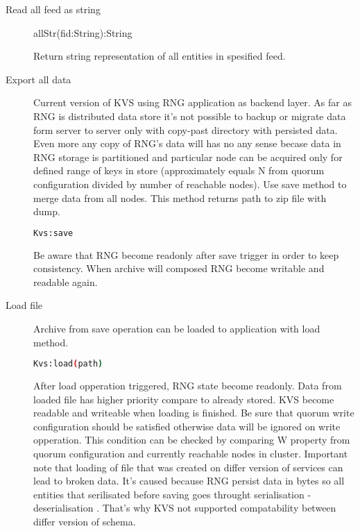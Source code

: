 \begin{description}

\item [Read all feed as string]
allStr(fid:String):String

Return string representation of all entities in spesified feed.

\item [Export all data]

Current version of KVS using RNG application as backend layer. As far as RNG is distributed data store it's not possible
to backup or migrate data form server to server only with copy-past directory with persisted data. Even more any copy
of RNG's data will has no any sense becase data in RNG storage is partitioned and particular node can be acquired only for
defined range of keys in store (approximately equals N from quorum configuration divided by  number of reachable nodes).
Use save method to merge data from all nodes. This method returns path to zip file with dump.

\begin{lstlisting}[language=bash]
Kvs:save
\end{lstlisting}

Be aware that RNG become readonly after save trigger in order to keep consistency. When archive will composed RNG become writable and
readable again.

\item [Load file]
Archive from save operation can be loaded to application with load method.

\begin{lstlisting}[language=bash]
Kvs:load(path)
\end{lstlisting}


After load opperation triggered, RNG state become readonly. Data from loaded file has higher priority compare to already stored.
KVS become readable and writeable when loading is finished.
Be sure that quorum write configuration should be satisfied otherwise data will be ignored on write opperation. This condition can be checked by comparing
 W property from quorum configuration and currently reachable nodes in cluster.
 Important note that loading of file that was created on differ version of services can lead to broken data. It's caused
  because RNG persist data in bytes so all entities that serilisated before saving goes throught serialisation - deserialisation .
  That's why KVS not supported compatability between differ version of schema.

\end{description}

